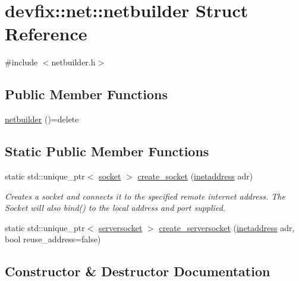 \hypertarget{structdevfix_1_1net_1_1netbuilder}{}\section{devfix\+:\+:net\+:\+:netbuilder Struct Reference}
\label{structdevfix_1_1net_1_1netbuilder}


{\ttfamily \#include $<$netbuilder.\+h$>$}

\subsection*{Public Member Functions}
\begin{DoxyCompactItemize}
\item 
\hyperlink{structdevfix_1_1net_1_1netbuilder_a36946dc1bd85a68d5c38aaf8533dd401}{netbuilder} ()=delete
\end{DoxyCompactItemize}
\subsection*{Static Public Member Functions}
\begin{DoxyCompactItemize}
\item 
static std\+::unique\+\_\+ptr$<$ \hyperlink{structdevfix_1_1net_1_1socket}{socket} $>$ \hyperlink{structdevfix_1_1net_1_1netbuilder_a9d9eb6cb050ca920aa647baaf4692405}{create\+\_\+socket} (\hyperlink{structdevfix_1_1net_1_1inetaddress}{inetaddress} adr)
\begin{DoxyCompactList}\small\item\em Creates a socket and connects it to the specified remote internet address. The Socket will also bind() to the local address and port supplied. \end{DoxyCompactList}\item 
static std\+::unique\+\_\+ptr$<$ \hyperlink{structdevfix_1_1net_1_1serversocket}{serversocket} $>$ \hyperlink{structdevfix_1_1net_1_1netbuilder_a9d685e1822c0be5d68fd6ba62876798b}{create\+\_\+serversocket} (\hyperlink{structdevfix_1_1net_1_1inetaddress}{inetaddress} adr, bool reuse\+\_\+address=false)
\end{DoxyCompactItemize}


\subsection{Constructor \& Destructor Documentation}
\mbox{\label{structdevfix_1_1net_1_1netbuilder_a36946dc1bd85a68d5c38aaf8533dd401}} 
